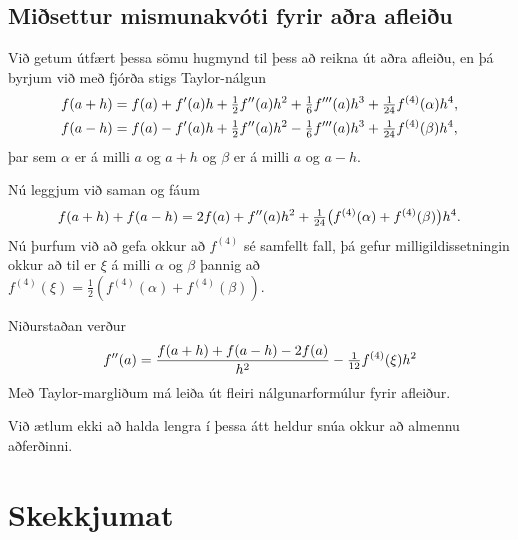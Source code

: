 \documentclass[letterpaper,10pt,icelandic]{sphinxmanual}
\begin{document}

\subsection{Miðsettur mismunakvóti fyrir aðra afleiðu}
\label{kafli04:misettur-mismunakvoti-fyrir-ara-afleiu}\label{kafli04:index-4}
Við getum útfært þessa sömu hugmynd til þess að reikna út aðra afleiðu,
en þá byrjum við með fjórða stigs Taylor-nálgun
\begin{gather}
\begin{split}\begin{aligned}
  f(a+h)&=f(a)+f'(a)h+\tfrac 12 f''(a)h^2+\tfrac 16 f'''(a)h^3
+\tfrac 1{24}f^{(4)}(\alpha)h^4,\\
  f(a-h)&=f(a)-f'(a)h+\tfrac 12 f''(a)h^2-\tfrac 16 f'''(a)h^3
+\tfrac 1{24}f^{(4)}(\beta)h^4,\end{aligned}\end{split}\notag
\end{gather}
þar sem \(\alpha\) er á milli \(a\) og \(a+h\) og
\(\beta\) er á milli \(a\) og \(a-h\).

Nú leggjum við saman og fáum
\begin{gather}
\begin{split}f(a+h)+f(a-h)=2f(a) +f''(a)h^2+\tfrac
1{24}\big(f^{(4)}(\alpha)+f^{(4)}(\beta)\big)h^4.\end{split}\notag
\end{gather}
Nú þurfum við að gefa okkur að \(f^{(4)}\) sé samfellt fall, þá
gefur milligildissetningin okkur að til er \(\xi\) á milli
\(\alpha\) og \(\beta\) þannig að
\(f^{(4)}(\xi)=\tfrac 12 (f^{(4)}(\alpha)+f^{(4)}(\beta))\).

Niðurstaðan verður
\begin{gather}
\begin{split}f''(a)=\dfrac{f(a+h)+f(a-h)-2f(a)}{h^2}-\tfrac 1{12}f^{(4)}(\xi)h^2\end{split}\notag
\end{gather}
Með Taylor-margliðum má leiða út fleiri nálgunarformúlur fyrir afleiður.

Við ætlum ekki að halda lengra í þessa átt heldur snúa okkur að almennu
aðferðinni.


\section{Skekkjumat}
\label{kafli04:skekkjumat}
\end{document}
